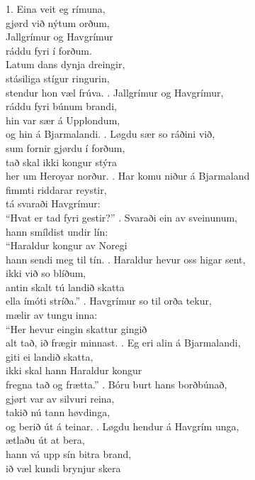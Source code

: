 \newpage
{}
\begin{flushleft}
1. Eina veit eg rímuna,\\
gjørd við nýtum orðum,\\
Jallgrímur og Havgrímur\\
ráddu fyri í forðum.
\hops
\hspace{0.9cm}\\
\hspace{0.9cm}Latum dans dynja dreingir,\\
\hspace{0.9cm}stásiliga stígur ringurin,\\
\hspace{0.9cm}stendur hon væl frúva.
. Jallgrímur og Havgrímur,\\
ráddu fyri búnum brandi,\\
hin var sær á Upplondum,\\
og hin á Bjarmalandi.
. Løgdu sær so ráðini við,\\
sum fornir gjørdu í forðum,\\
tað skal ikki kongur stýra\\
her um Heroyar norður.
. Har komu niður á Bjarmaland\\
fimmti riddarar reystir,\\
tá svaraði Havgrímur:\\
“Hvat er tad fyri gestir?”
. Svaraði ein av sveinunum,\\
hann smíldist undir lín:\\
“Haraldur kongur av Noregi\\
hann sendi meg til tín.
. Haraldur hevur oss higar sent,\\
ikki við so blíðum,\\
antin skalt tú landið skatta\\
ella ímóti stríða.”
. Havgrímur so til orða tekur,\\
mælir av tungu inna:\\
“Her hevur eingin skattur gingið\\
alt tað, ið frægir minnast.
. Eg eri alin á Bjarmalandi,\\
giti ei landið skatta,\\
ikki skal hann Haraldur kongur\\
fregna tað og frætta.”
. Bóru burt hans borðbúnað,\\
gjørt var av silvuri reina,\\
takið nú tann høvdinga,\\
og berið út á teinar.
. Løgdu hendur á Havgrím unga,\\
ætlaðu út at bera,\\
hann vá upp sín bitra brand,\\
ið væl kundi brynjur skera
\end{flushleft}

